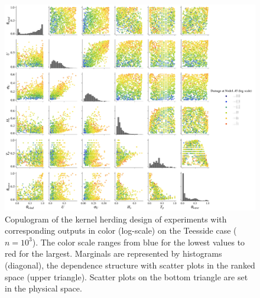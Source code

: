 \begin{figure}[!h]
\begin{center}
    \includegraphics[width=\textwidth]{part2/figures/DCE/teesside/kh_output_pairplot.jpg}
\end{center}
\caption{Copulogram of the kernel herding design of experiments with corresponding outputs in color (log-scale) on the Teesside case ($n = 10^3$). 
The color scale ranges from blue for the lowest values to red for the largest.
Marginals are represented by histograms (diagonal), the dependence structure with scatter plots in the ranked space (upper triangle). 
Scatter plots on the bottom triangle are set in the physical space.} \label{fig:pairplot_kh_teesside}
\end{figure}

